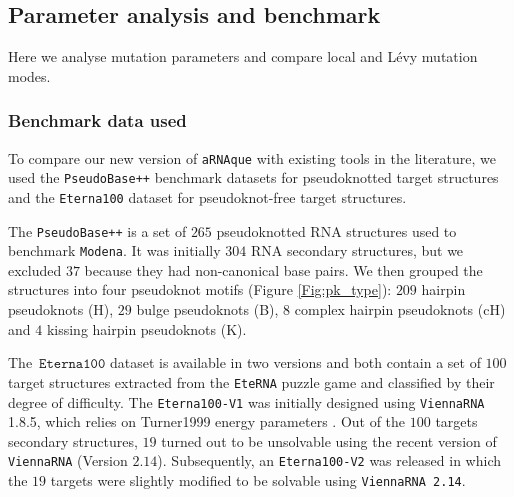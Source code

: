 \subsection{Parameter analysis and benchmark}
Here we analyse mutation parameters and compare local and Lévy mutation modes. 

\subsubsection{Benchmark data used}
To compare our new version of \texttt{aRNAque} with existing tools in the literature, we used the \texttt{PseudoBase++} benchmark datasets for  pseudoknotted target structures and the \texttt{Eterna100} dataset for pseudoknot-free target structures.

The \texttt{PseudoBase++} is a set of $265$ pseudoknotted RNA structures used to benchmark \texttt{Modena}. It was initially $304$ RNA secondary structures, but we excluded $37$ because they had non-canonical base pairs. We then grouped the structures into four pseudoknot motifs (Figure \ref{Fig:pk_type}): $209$ hairpin pseudoknots (H), $29$ bulge pseudoknots (B), $8$ complex hairpin pseudoknots (cH) and $4$ kissing hairpin pseudoknots (K).  

The~\(\texttt{Eterna100}\) dataset \cite{Eterna} is available in two versions and both contain a set of \(100\) target structures extracted from the \texttt{EteRNA} puzzle game and classified by their degree of difficulty. The \texttt{Eterna100-V1} was initially designed using \texttt{ViennaRNA} 1.8.5, which relies on Turner1999 energy parameters \cite{Turn1999}. Out of the $100$ targets secondary structures, $19$ turned out to be unsolvable using the recent version of \texttt{ViennaRNA} (Version $2.14$). Subsequently, an \texttt{Eterna100-V2} \cite{Eterna} was released in which the $19$ targets were slightly modified to be solvable using \texttt{ViennaRNA 2.14}. 

